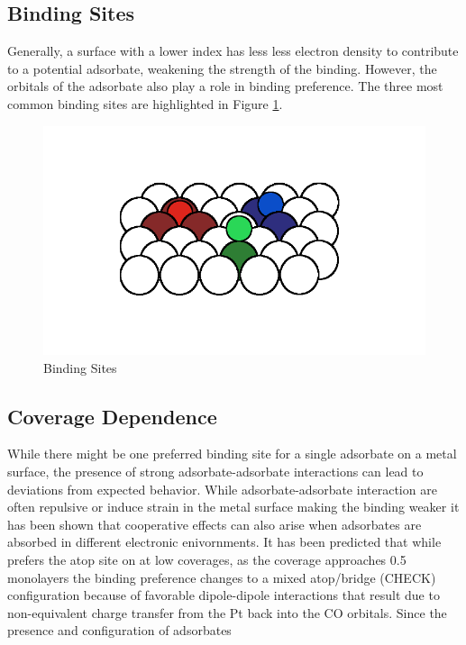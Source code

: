 \subsection{Binding Sites}
Generally, a surface with a lower index has less less electron density to
contribute to a potential adsorbate, weakening the strength of the binding.
However, the orbitals of the adsorbate also play a role in binding preference.
The three most common binding sites are highlighted in Figure
\ref{fig:binding}.
\begin{figure}
  \includegraphics[width=\linewidth]{../figures/chap1/binding.pdf}
  \caption{Binding Sites}
\label{fig:binding}
\end{figure}


\subsection{Coverage Dependence}
While there might be one preferred binding site for a single adsorbate on a
metal surface, the presence of strong adsorbate-adsorbate interactions can lead
to deviations from expected behavior. While adsorbate-adsorbate interaction are
often repulsive or induce strain in the metal surface making the binding
weaker\citep{} it has been shown that cooperative effects can also arise when
adsorbates are absorbed in different electronic enivornments. It has been
predicted that while  prefers the atop site on  at low coverages,
as the coverage approaches 0.5 monolayers the binding preference changes to a
mixed atop/bridge (CHECK) configuration because of favorable dipole-dipole
interactions that result due to non-equivalent charge transfer from the Pt back
into the CO orbitals. Since the presence and configuration of adsorbates 


